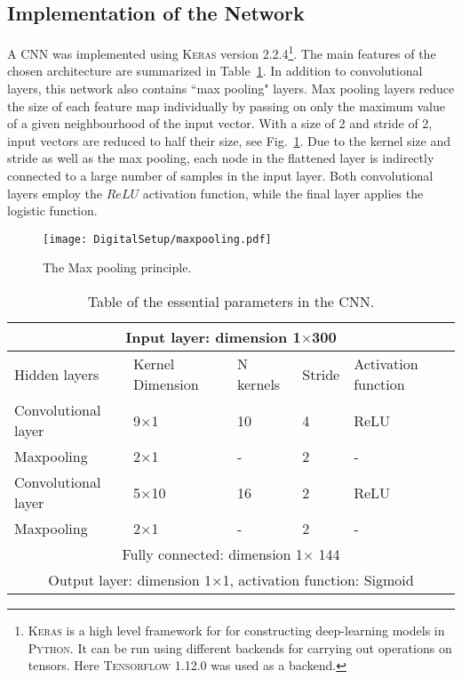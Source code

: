 \documentclass[main.tex]{subfiles}
\begin{document}
\subsection{Implementation of the Network}
A CNN was implemented using \textsc{Keras} version 2.2.4\footnote{\textsc{Keras} is a high level framework for for constructing deep-learning models in \textsc{Python}. It can be run using different backends for carrying out operations on tensors. Here \textsc{Tensorflow} 1.12.0 was used as a backend.}\cite{keras}. The main features of the chosen architecture are summarized in Table~\ref{tab:architecture}. In addition to convolutional layers, this network also contains ``max pooling" layers. Max pooling layers reduce the size of each feature map individually by passing on only the maximum value of a given neighbourhood of the input vector. With a size of 2 and stride of 2, input vectors are reduced to half their size, see Fig.~\ref{fig:maxpooking}. Due to the kernel size and stride as well as the max pooling, each node in the flattened layer is indirectly connected to a large number of samples in the input layer. Both convolutional layers employ the $ReLU$ activation function, while the final layer applies the logistic function.
\begin{figure}[ht!]
    \centering
        \texttt{[image: DigitalSetup/maxpooling.pdf]}
        \caption[The Max pooling principle]{The Max pooling principle.}
    \label{fig:maxpooking} 
\end{figure}

\begin{table}[h]
\center
\begin{tabular}{|l|l|l|l|l|}
\hline
\multicolumn{5}{|c|}{Input layer: dimension 1$\times$300}                                            \\ \hline
Hidden layers       & Kernel Dimension & N kernels & Stride & Activation function \\ \hline
Convolutional layer & 9$\times$1           & 10                & 4             & ReLU                \\ \hline
Maxpooling          & 2$\times$1           & -                 & 2             & -                   \\ \hline
Convolutional layer & 5$\times$10           & 16                & 2             & ReLU                \\ \hline
Maxpooling          & 2$\times$1           & -                 & 2             & -                   \\ \hline
\multicolumn{5}{|c|}{Fully connected: dimension 1$\times$ 144}
\\ \hline
\multicolumn{5}{|c|}{Output layer: dimension 1$\times$1, activation function: Sigmoid}               \\ \hline
\end{tabular}
\caption{Table of the essential parameters in the CNN.}
\label{tab:architecture}
\end{table}
\end{document}

